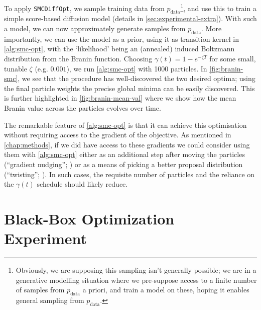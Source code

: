 To apply \texttt{SMCDiffOpt}, we sample training data from $p_{\text{data}}$\footnote{Obviously, we
are supposing this sampling isn't generally possible; we are in a generative modelling situation
where we pre-suppose access to a finite number of samples from $p_{\text{data}}$ a priori, and
train a model on these, hoping it enables general sampling from $p_{\text{data}}$.}, and use this
to train a simple score-based diffusion model (details in \autoref{sec:experimental-extra}). With such
a model, we can now approximately generate samples from $p_{\text{data}}$. More importantly, we can
use the model as a prior, using it as transition kernel in \autoref{alg:smc-opt}, with the `likelihood'
being an (annealed) induced Boltzmann distribution from the Branin function. Choosing
$\gamma(t) = 1 - e^{-\zeta T}$ for some small, tunable $\zeta$ (e.g. $0.001$), we run
\autoref{alg:smc-opt} with 1000 particles. In \autoref{fig:branin-smc}, we see that the procedure has
well-discovered the two desired optima; using the final particle weights the precise global minima
can be easily discovered. This is further highlighted in \autoref{fig:branin-mean-val} where we show
how the mean Branin value across the particles evolves over time.

The remarkable feature of \autoref{alg:smc-opt} is that it can achieve this optimisation without
requiring access to the gradient of the objective. As mentioned in \autoref{chap:methods}, if we did
have access to these gradients we could consider using them with \autoref{alg:smc-opt} either as an
additional step after moving the particles
(``gradient nudging''; \parencite{akyildizNudgingParticleFilter2020}) or as a means of picking a
better proposal distribution (``twisting''; \parencite{wuPracticalAsymptoticallyExact2023}). In
such cases, the requisite number of particles and the reliance on the $\gamma(t)$ schedule should
likely reduce.

\section{Black-Box Optimization Experiment} \label{sec:superconductor}

\begin{table}[ht]
    \centering
    \caption{Normalized scores for SuperConductor experiment}
    \label{tab:superconductor-norm}
\end{table}
